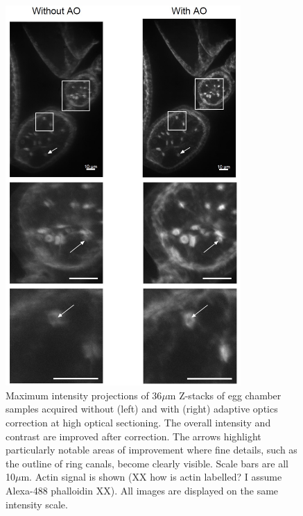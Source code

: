 \begin{figure}[h]
	\centering
	\includegraphics[width=0.8\textwidth]{images/Aurox_egg_chambers_composite.jpg}
	\caption[\textit{Drosophila} egg chamber data acquired on the Aurox imaging 
	system]{Maximum intensity projections of 36$\mu$m Z-stacks of egg 
		chamber samples acquired without (left) and with (right) adaptive 
		optics correction at high optical sectioning. The overall intensity 
		and contrast are improved after correction. The arrows highlight 
		particularly notable areas of improvement where fine details, such 
		as the outline of ring canals, become clearly visible. Scale bars 
		are all 10$\mu$m. Actin signal is shown (XX how is
                actin labelled? I assume Alexa-488 phalloidin XX). All images are displayed 
		on the same intensity scale.}
	\label{fig:Aurox_egg_chambers_composite}
\end{figure}

